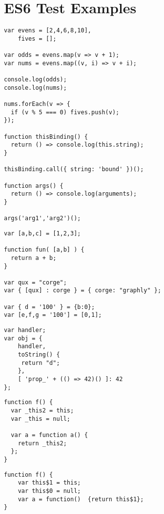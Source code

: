 
\chapter{ES6 Test Examples} %

\label{AppendixC} %


\begin{lstlisting}[caption=Arrow function]
var evens = [2,4,6,8,10],
    fives = [];

var odds = evens.map(v => v + 1);
var nums = evens.map((v, i) => v + i);

console.log(odds);
console.log(nums);

nums.forEach(v => {
  if (v % 5 === 0) fives.push(v);
});

function thisBinding() {
  return () => console.log(this.string);
}

thisBinding.call({ string: 'bound' })();

function args() {
  return () => console.log(arguments);
}

args('arg1','arg2')();
\end{lstlisting}

\begin{lstlisting}[caption=Destructuring]
var [a,b,c] = [1,2,3];

function fun( [a,b] ) {
  return a + b;
}

var qux = "corge";
var { [qux] : corge } = { corge: "graphly" };

var { d = '100' } = {b:0};
var [e,f,g = '100'] = [0,1];
\end{lstlisting}

\begin{lstlisting}[caption=Object literals]
var handler;
var obj = {
    handler,
    toString() {
     return "d";
    },
    [ 'prop_' + (() => 42)() ]: 42
};
\end{lstlisting}

\begin{lstlisting}[caption=Babel JS]
function f() {
  var _this2 = this;
  var _this = null;
  
  var a = function a() {
    return _this2;
  };
}
\end{lstlisting}

\begin{lstlisting}[caption=ES6 Transpiler]
function f() {
	var this$1 = this;
  	var this$0 = null;
  	var a = function()  {return this$1}; 
}
\end{lstlisting}